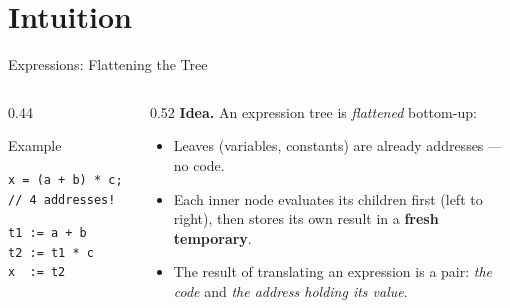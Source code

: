 \documentclass[aspectratio=169,11pt,xcolor=table]{beamer}
\begin{document}

\section{Intuition}

\begin{frame}[fragile]{Expressions: Flattening the Tree}
  \begin{columns}[T]
    \begin{column}{0.44\textwidth}
      \begin{block}{Example}
        \begin{verbatim}
x = (a + b) * c; // 4 addresses!
        \end{verbatim}
        \vspace{0.3em} \pause
        \begin{verbatim}
t1 := a + b
t2 := t1 * c
x  := t2
        \end{verbatim}
      \end{block}
    \end{column} \pause
    \begin{column}{0.52\textwidth}
      \textbf{Idea.} An expression tree is \emph{flattened} bottom-up:
      \begin{itemize}
        \item Leaves (variables, constants) are already addresses — no code.
        \item Each inner node evaluates its children first (left to right),
              then stores its own result in a \textbf{fresh temporary}.
        \item The result of translating an expression is a pair:
              \emph{the code} and \emph{the address holding its value}.
      \end{itemize}
    \end{column}

  \end{columns}
\end{frame}
\end{document}
